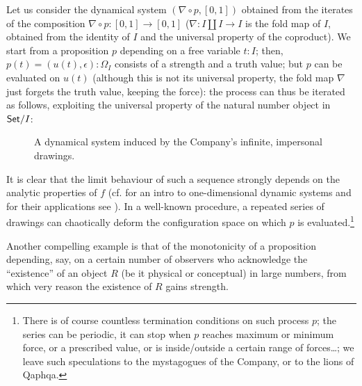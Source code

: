 \begin{example}
	Let us consider the dynamical system $(\nabla\circ p, [0,1])$ obtained from the iterates of the composition $\nabla \circ p : [0,1] \to [0,1]$ ($\nabla : I\amalg I \to I$ is the fold map of $I$, obtained from the identity of $I$ and the universal property of the coproduct). We start from a proposition $p$ depending on a free variable $t : I$; then, $p(t) = (u(t),\epsilon): \Omega_I$ consists of a strength and a truth value; but $p$ can be evaluated on $u(t)$ (although this is not its universal property, the fold map $\nabla$ just forgets the truth value, keeping the force): the process can thus be iterated as follows, exploiting the universal property of the natural number object in $\mathsf{Set}/I$:
	\begin{center}
		\begin{figure}[h]
			\def\line{\draw (0,0) -- (1,0); \draw (0,.5) -- (1,.5);}
			\caption{A dynamical system induced by the Company's infinite, impersonal drawings.}
			\label{fig_dynamics}
		\end{figure}
	\end{center}
	It is clear that the limit behaviour of such a sequence strongly depends on the analytic properties of $f$ (cf. \cite{strogatz1996nonlinear} for an intro to one-dimensional dynamic systems and for their applications see \cite{wiggins2003introduction}). In a well-known procedure, a repeated series of drawings can chaotically deform the configuration space on which $p$ is evaluated.\footnote{There is of course countless termination conditions on such process $p$; the series can be periodic, it can stop when $p$ reaches maximum or minimum force, or a prescribed value, or is inside/outside a certain range of forces\dots; we leave such speculations to the mystagogues of the Company, or to the lions of Qaphqa.}
\end{example}
Another compelling example is that of the monotonicity of a proposition depending, say, on a certain number of observers who acknowledge the ``existence'' of an object $R$ (be it physical or conceptual) in large numbers, from which very reason the existence of $R$ gains strength.
